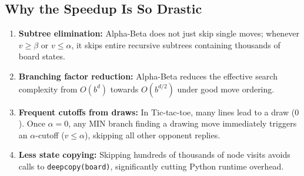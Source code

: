 \documentclass[11pt,a4paper]{article}
\begin{document}
\subsection{Why the Speedup Is So Drastic}
\begin{enumerate}
    \item \textbf{Subtree elimination:} Alpha-Beta does not just skip single moves; whenever $v \ge \beta$ or $v \le \alpha$, it skips entire recursive subtrees containing thousands of board states.
    \item \textbf{Branching factor reduction:} Alpha-Beta reduces the effective search complexity from $O(b^d)$ towards $O(b^{d/2})$ under good move ordering.
    \item \textbf{Frequent cutoffs from draws:} In Tic-tac-toe, many lines lead to a draw ($0$). Once $\alpha = 0$, any MIN branch finding a drawing move immediately triggers an $\alpha$-cutoff ($v \le \alpha$), skipping all other opponent replies.
    \item \textbf{Less state copying:} Skipping hundreds of thousands of node visits avoids calls to \texttt{deepcopy(board)}, significantly cutting Python runtime overhead.
\end{enumerate}
\end{document}
